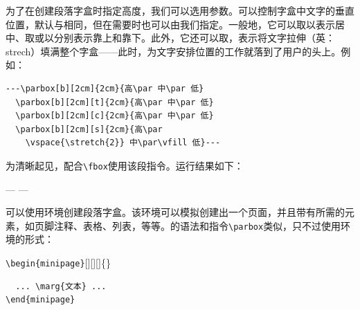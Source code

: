 为了在创建段落字盒时指定高度，我们可以选用参数。可以控制字盒中文字的垂直位置，默认与相同，但在需要时也可以由我们指定。一般地，它可以取以表示居中、取或以分别表示靠上和靠下。此外，它还可以取，表示将文字拉伸（英：strech）填满整个字盒——此时，为文字安排位置的工作就落到了用户的头上。例如：

\begin{dmd}
\begin{verbatim}
---\parbox[b][2cm]{2cm}{高\par 中\par 低}
  \parbox[b][2cm][t]{2cm}{高\par 中\par 低}
  \parbox[b][2cm][c]{2cm}{高\par 中\par 低}
  \parbox[b][2cm][s]{2cm}{高\par
    \vspace{\stretch{2}} 中\par\vfill 低}---\end{verbatim}
\end{dmd}

为清晰起见，配合\verb|\fbox|使用该段指令。运行结果如下：

---
  ---

可以使用环境创建段落字盒。该环境可以模拟创建出一个页面，并且带有所需的元素，如页脚注释、表格、列表，等等。的语法和指令\verb|\parbox|类似，只不过使用环境的形式：

\begin{dmd}
\verb+\begin{minipage}+[][][]\{\}
\begin{verbatim}
  ... \marg{文本} ...
\end{minipage}\end{verbatim}
\end{dmd}

